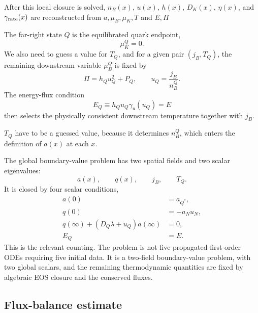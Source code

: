 \documentclass[11pt]{article}
\begin{document}
{After this local closure is solved, \(n_B(x)\), \(u(x)\), \(h(x)\),
\(D_K(x)\), \(\eta(x)\), and \(\gamma_{\rm rate}(x)\) are reconstructed from $a, \mu_B, \mu_K, T$ and $E, \Pi$

The far-right state \(Q\) is the equilibrated quark endpoint,
\begin{equation}
\mu_K^Q=0.
\end{equation}
We also need to guess a value for $T_Q$, and for a given pair \((j_B,T_Q)\), the remaining downstream variable \(\mu_B^Q\)
is fixed by
\begin{equation}
\Pi=h_Qu_Q^2+P_Q,
\qquad
u_Q=\frac{j_B}{n_B^Q}.
\end{equation}
The energy-flux condition
\begin{equation}
E_Q \equiv h_Qu_Q\gamma_u(u_Q)=E
\end{equation}
then selects the physically consistent downstream temperature together with
\(j_B\).

$T_Q$ have to be a guessed value, because it determines $n_B^Q$, which enters the definition of $a(x)$ at each $x$.

The global boundary-value problem has two spatial fields and two scalar
eigenvalues:
\begin{equation}
a(x),\qquad q(x),\qquad j_B,\qquad T_Q.
\end{equation}
It is closed by four scalar conditions,
\begin{align}
a(0) &= a_{Q^\ast},
\\
q(0) &= -a_Nu_N,
\\
q(\infty)+\left(D_Q\lambda+u_Q\right)a(\infty) &= 0,
\\
E_Q &= E.
\end{align}
This is the relevant counting.  The problem is not five propagated first-order
ODEs requiring five initial data.  It is a two-field boundary-value problem,
with two global scalars, and the remaining thermodynamic quantities are fixed
by algebraic EOS closure and the conserved fluxes.

}


\subsection{Flux-balance estimate}
\label{sec:flux-balance-estimate}
\end{document}
